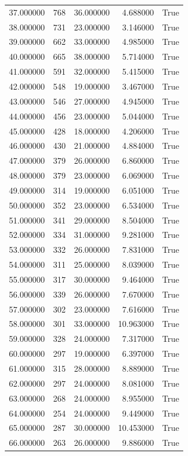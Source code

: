 \begin{longtable}{rrrrr}
37.000000 & 768 & 36.000000 & 4.688000 & True \\
38.000000 & 731 & 23.000000 & 3.146000 & True \\
39.000000 & 662 & 33.000000 & 4.985000 & True \\
40.000000 & 665 & 38.000000 & 5.714000 & True \\
41.000000 & 591 & 32.000000 & 5.415000 & True \\
42.000000 & 548 & 19.000000 & 3.467000 & True \\
43.000000 & 546 & 27.000000 & 4.945000 & True \\
44.000000 & 456 & 23.000000 & 5.044000 & True \\
45.000000 & 428 & 18.000000 & 4.206000 & True \\
46.000000 & 430 & 21.000000 & 4.884000 & True \\
47.000000 & 379 & 26.000000 & 6.860000 & True \\
48.000000 & 379 & 23.000000 & 6.069000 & True \\
49.000000 & 314 & 19.000000 & 6.051000 & True \\
50.000000 & 352 & 23.000000 & 6.534000 & True \\
51.000000 & 341 & 29.000000 & 8.504000 & True \\
52.000000 & 334 & 31.000000 & 9.281000 & True \\
53.000000 & 332 & 26.000000 & 7.831000 & True \\
54.000000 & 311 & 25.000000 & 8.039000 & True \\
55.000000 & 317 & 30.000000 & 9.464000 & True \\
56.000000 & 339 & 26.000000 & 7.670000 & True \\
57.000000 & 302 & 23.000000 & 7.616000 & True \\
58.000000 & 301 & 33.000000 & 10.963000 & True \\
59.000000 & 328 & 24.000000 & 7.317000 & True \\
60.000000 & 297 & 19.000000 & 6.397000 & True \\
61.000000 & 315 & 28.000000 & 8.889000 & True \\
62.000000 & 297 & 24.000000 & 8.081000 & True \\
63.000000 & 268 & 24.000000 & 8.955000 & True \\
64.000000 & 254 & 24.000000 & 9.449000 & True \\
65.000000 & 287 & 30.000000 & 10.453000 & True \\
66.000000 & 263 & 26.000000 & 9.886000 & True \\

\end{longtable}
